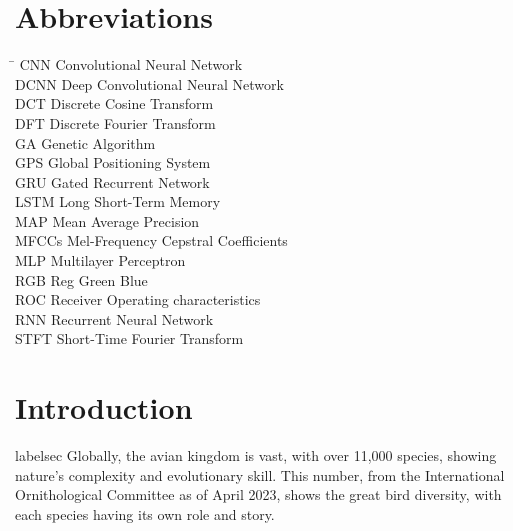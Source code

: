 

\chapter*{Abbreviations}
\begin{tabbing}
    \hspace{50mm}\=\kill
    CNN \> Convolutional Neural Network\\
    DCNN \> Deep Convolutional Neural Network\\
    DCT \> Discrete Cosine Transform\\
    DFT \> Discrete Fourier Transform\\
    GA \> Genetic Algorithm\\
    GPS \> Global Positioning System\\
    GRU \> Gated Recurrent Network\\
    LSTM \> Long Short-Term Memory\\
    MAP \> Mean Average Precision\\
    MFCCs \> Mel-Frequency Cepstral Coefficients\\
    MLP \> Multilayer Perceptron\\
    RGB \> Reg Green Blue\\
    ROC \> Receiver Operating characteristics\\
    RNN \> Recurrent Neural Network\\
    STFT \> Short-Time Fourier Transform\\
\end{tabbing}
\newpage
{}

\chapter{Introduction}label{sec}
Globally, the avian kingdom is vast, with over 11,000 species, showing nature's
complexity and evolutionary skill. This number, from the International Ornithological
Committee as of April 2023, shows the great bird diversity, with each species having 
its own role and story.\cite{ioc_updates}

